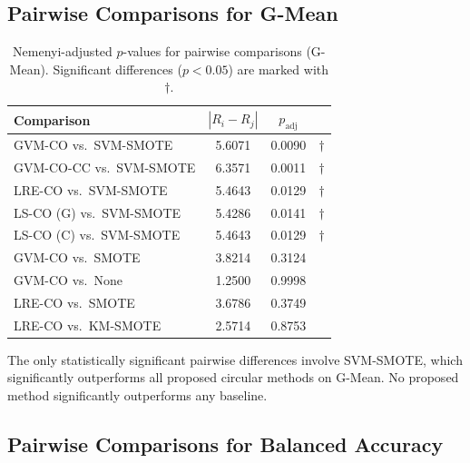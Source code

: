 \subsection{Pairwise Comparisons for G-Mean}

\begin{table}[H]
\centering
\caption{Nemenyi-adjusted $p$-values for pairwise comparisons (G-Mean). Significant differences ($p < 0.05$) are marked with $\dagger$.}
\label{tab:stat:nemenyi_gmean}
\small
\begin{tabular}{lccc}
\toprule
\textbf{Comparison} & \textbf{$|R_i - R_j|$} & \textbf{$p_{\mathrm{adj}}$} & \\
\midrule
GVM-CO vs.\ SVM-SMOTE    & 5.6071 & 0.0090 & $\dagger$ \\
GVM-CO-CC vs.\ SVM-SMOTE & 6.3571 & 0.0011 & $\dagger$ \\
LRE-CO vs.\ SVM-SMOTE    & 5.4643 & 0.0129 & $\dagger$ \\
LS-CO (G) vs.\ SVM-SMOTE & 5.4286 & 0.0141 & $\dagger$ \\
LS-CO (C) vs.\ SVM-SMOTE & 5.4643 & 0.0129 & $\dagger$ \\
\midrule
GVM-CO vs.\ SMOTE        & 3.8214 & 0.3124 & \\
GVM-CO vs.\ None         & 1.2500 & 0.9998 & \\
LRE-CO vs.\ SMOTE        & 3.6786 & 0.3749 & \\
LRE-CO vs.\ KM-SMOTE     & 2.5714 & 0.8753 & \\
\bottomrule
\end{tabular}
\end{table}

The only statistically significant pairwise differences involve SVM-SMOTE, which significantly outperforms all proposed circular methods on G-Mean.
No proposed method significantly outperforms any baseline.

\subsection{Pairwise Comparisons for Balanced Accuracy}

